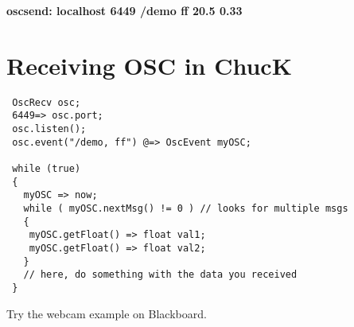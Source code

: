 \documentclass{article}
\begin{document}
\textbf{oscsend: localhost 6449 /demo ff 20.5 0.33}

\section{Receiving OSC in ChucK}

\begin{lstlisting}
 OscRecv osc;
 6449=> osc.port;
 osc.listen();
 osc.event("/demo, ff") @=> OscEvent myOSC;

 while (true)
 {
   myOSC => now;
   while ( myOSC.nextMsg() != 0 ) // looks for multiple msgs
   {
    myOSC.getFloat() => float val1;
    myOSC.getFloat() => float val2;
   }
   // here, do something with the data you received
 }
\end{lstlisting}

Try the webcam example on Blackboard.
\end{document}
